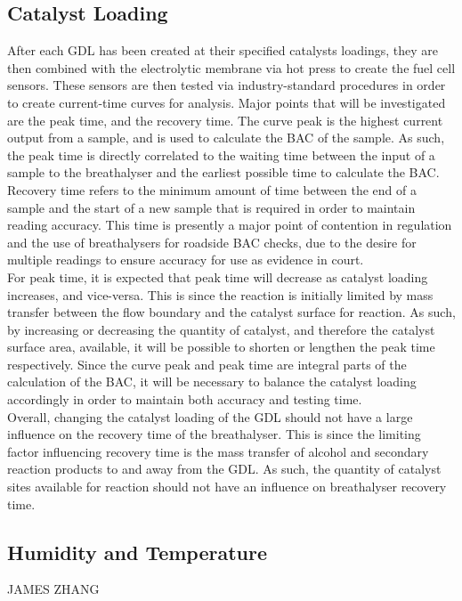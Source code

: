 \documentclass{article}
\begin{document}
    \subsection{Catalyst Loading}
      After each GDL has been created at their specified catalysts loadings, they are then combined with the electrolytic membrane via hot press to create the fuel cell sensors. These sensors are then tested via industry-standard procedures in order to create current-time curves for analysis. Major points that will be investigated are the peak time, and the recovery time. The curve peak is the highest current output from a sample, and is used to calculate the BAC of the sample. As such, the peak time is directly correlated to the waiting time between the input of a sample to the breathalyser and the earliest possible time to calculate the BAC. Recovery time refers to the minimum amount of time between the end of a sample and the start of a new sample that is required in order to maintain reading accuracy. This time is presently a major point of contention in regulation and the use of breathalysers for roadside BAC checks, due to the desire for multiple readings to ensure accuracy for use as evidence in court.\\

      For peak time, it is expected that peak time will decrease as catalyst loading increases, and vice-versa. This is since the reaction is initially limited by mass transfer between the flow boundary and the catalyst surface for reaction. As such, by increasing or decreasing the quantity of catalyst, and therefore the catalyst surface area, available, it will be possible to shorten or lengthen the peak time respectively. Since the curve peak and peak time are integral parts of the calculation of the BAC, it will be necessary to balance the catalyst loading accordingly in order to maintain both accuracy and testing time.\\
      Overall, changing the catalyst loading of the GDL should not have a large influence on the recovery time of the breathalyser. This is since the limiting factor influencing recovery time is the mass transfer of alcohol and secondary reaction products to and away from the GDL. As such, the quantity of catalyst sites available for reaction should not have an influence on breathalyser recovery time.
      \subsection{Humidity and Temperature}
      JAMES ZHANG
\end{document}
